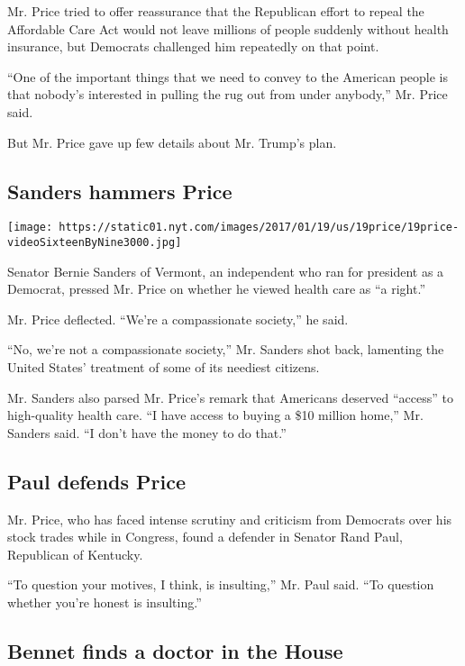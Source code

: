 Mr. Price tried to offer reassurance that the Republican effort to
repeal the Affordable Care Act would not leave millions of people
suddenly without health insurance, but Democrats challenged him
repeatedly on that point.

``One of the important things that we need to convey to the American
people is that nobody's interested in pulling the rug out from under
anybody,'' Mr. Price said.

But Mr. Price gave up few details about Mr. Trump's plan.

\hypertarget{sanders-hammers-price}{%
\subsection{Sanders hammers Price}\label{sanders-hammers-price}}

\texttt{[image: https://static01.nyt.com/images/2017/01/19/us/19price/19price-videoSixteenByNine3000.jpg]}

Senator Bernie Sanders of Vermont, an independent who ran for president
as a Democrat, pressed Mr. Price on whether he viewed health care as ``a
right.''

Mr. Price deflected. ``We're a compassionate society,'' he said.

``No, we're not a compassionate society,'' Mr. Sanders shot back,
lamenting the United States' treatment of some of its neediest citizens.

Mr. Sanders also parsed Mr. Price's remark that Americans deserved
``access'' to high-quality health care. ``I have access to buying a \$10
million home,'' Mr. Sanders said. ``I don't have the money to do that.''

\hypertarget{paul-defends-price}{%
\subsection{Paul defends Price}\label{paul-defends-price}}

Mr. Price, who has faced intense scrutiny and criticism from Democrats
over his stock trades while in Congress, found a defender in Senator
Rand Paul, Republican of Kentucky.

``To question your motives, I think, is insulting,'' Mr. Paul said. ``To
question whether you're honest is insulting.''

\hypertarget{bennet-finds-a-doctor-in-the-house}{%
\subsection{Bennet finds a doctor in the
House}\label{bennet-finds-a-doctor-in-the-house}}

